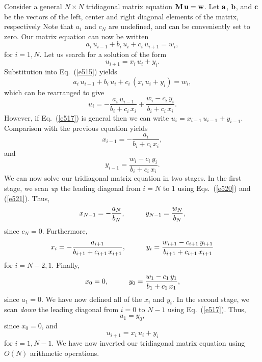 Consider a general $N\times N$ tridiagonal matrix equation ${\bf M}\,{\bf u} = {\bf w}$. 
Let ${\bf a}$, ${\bf b}$, and ${\bf c}$ be the vectors of the left, center and right
diagonal elements of the matrix, respectively
 Note that $a_1$ and $c_N$ are undefined, and can be conveniently
set to zero. Our matrix equation can now be written
\begin{equation}\label{e515}
a_i\,u_{i-1}+ b_i\,u_i + c_i\,u_{i+1} = w_i,
\end{equation}
for $i=1,N$.
Let us search for a solution of the form
\begin{equation}\label{e517}
u_{i+1} = x_i\,u_i + y_i.
\end{equation}
Substitution into Eq.~(\ref{e515}) yields
\begin{equation}
a_i\,u_{i-1} + b_i\,u_i+c_i\,(x_i\,u_i+y_i) = w_i,
\end{equation}
which can be rearranged to give
\begin{equation}
u_i = - \frac{a_i\,u_{i-1}}{b_i+c_i\,x_i} + \frac{w_i-c_i\,y_i}{b_i+c_i\,x_i}.
\end{equation}
However, if Eq.~(\ref{e517}) is general then we can write $u_i = x_{i-1}\,u_{i-1} + y_{i-1}$.
Comparison with the previous equation yields
\begin{equation}\label{e520}
x_{i-1} = - \frac{a_i}{b_i+c_i\,x_i},
\end{equation}
and
\begin{equation}\label{e521}
y_{i-1} = \frac{w_i-c_i\,y_i}{b_i+c_i\,x_i}.
\end{equation}
We can now solve our tridiagonal matrix equation in two stages. In the first stage, we scan
{\em up} the leading diagonal from $i=N$ to $1$ using Eqs.~(\ref{e520}) and (\ref{e521}). Thus,
\begin{equation}
x_{N-1} = -\frac{a_N}{b_N},\mbox{\hspace{1cm}}y_{N-1} = \frac{w_N}{b_N},
\end{equation}
since $c_N=0$. Furthermore,
\begin{equation}
x_i = - \frac{a_{i+1}}{b_{i+1}+c_{i+1}\,x_{i+1}},\mbox{\hspace{1cm}}y_i =  
\frac{w_{i+1}-c_{i+1}\,y_{i+1}}{b_{i+1}+c_{i+1}\,x_{i+1}}
\end{equation}
for $i=N-2, 1$. Finally,
\begin{equation}
x_0 = 0,\mbox{\hspace{1cm}}y_0 = \frac{w_1-c_1\,y_1}{b_1+c_1\,x_1},
\end{equation}
since $a_1=0$. We have now defined all of the $x_i$ and $y_i$. In the second stage,
we scan {\em down} the leading diagonal from $i=0$ to $N-1$ using Eq.~(\ref{e517}).
Thus,
\begin{equation}
u_1 = y_0,
\end{equation}
since $x_0=0$, and
\begin{equation}
u_{i+1} = x_i\,u_i + y_i
\end{equation}
for $i=1, N-1$. We have now inverted our tridiagonal matrix equation using $O(N)$ arithmetic
operations.

